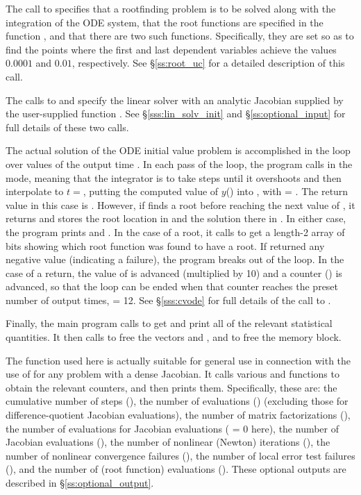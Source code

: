 The call to  specifies that a rootfinding problem
is to be solved along with the integration of the ODE system, that the
root functions are specified in the function , and that there are
two such functions.  Specifically, they are set so as to find the points
where the first and last dependent variables achieve the values $0.0001$
and $0.01$, respectively.
See \S\ref{ss:root_uc} for a detailed description of this call.

The calls to  and  specify the {\cvdense}
linear solver with an analytic Jacobian supplied by the user-supplied function
.  See \S\ref{sss:lin_solv_init} and \S\ref{ss:optional_input}
for full details of these two calls.

The actual solution of the ODE initial value problem is accomplished in
the loop over values of the output time .  In each pass of the
loop, the program calls  in the  mode, meaning that
the integrator is to take steps until it overshoots  and then
interpolate to $t = $, putting the computed value of $y$()
into , with  = .  The return value in this case is
.  However, if  finds a root before reaching the next
value of , it returns  and stores the root
location in  and the solution there in .  In either case, the
program prints  and .  In the case of a root, it calls
 to get a length-2 array  of bits showing
which root function was found to have a root.  If  returned any
negative value (indicating a failure), the program breaks out of the loop.  
In the case of a  return, the value of  is
advanced (multiplied by 10) and a counter () is advanced, so
that the loop can be ended when that counter reaches the preset number
of output times,  = 12.  See \S\ref{sss:cvode} for full
details of the call to .

Finally, the main program calls  to get and print
all of the relevant statistical quantities.  It then calls 
to free the vectors  and , and  to free the 
{\cvode} memory block.

The function  used here is actually suitable for
general use in connection with the use of {\cvode} for any problem with 
a dense Jacobian.  It calls various  and 
functions to obtain the relevant counters, and then prints them.
Specifically, these are: the cumulative number of steps (), 
the number of  evaluations () (excluding those for
difference-quotient Jacobian evaluations),
the number of matrix factorizations (),
the number of  evaluations for Jacobian evaluations (
= 0 here),
the number of Jacobian evaluations (),
the number of nonlinear (Newton) iterations (),
the number of nonlinear convergence failures (),
the number of local error test failures (), and
the number of  (root function) evaluations ().
These optional outputs are described in \S\ref{ss:optional_output}.


